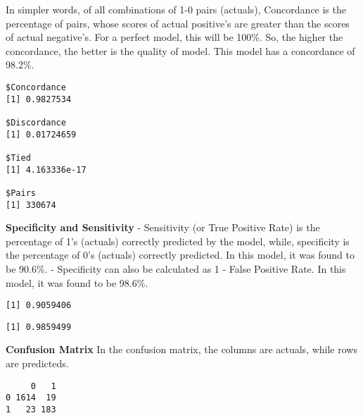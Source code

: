\documentclass[12pt,twoside]{reedthesis}
\newenvironment{Shaded}{\begin{snugshade}}{\end{snugshade}}
\newcommand{\KeywordTok}[1]{\textcolor[rgb]{0.13,0.29,0.53}{\textbf{{#1}}}}
\newcommand{\DataTypeTok}[1]{\textcolor[rgb]{0.13,0.29,0.53}{{#1}}}
\newcommand{\NormalTok}[1]{{#1}}
\theoremstyle{definition}
\theoremstyle{definition}
\theoremstyle{definition}
\theoremstyle{remark}
\begin{document}
In simpler words, of all combinations of 1-0 pairs (actuals),
Concordance is the percentage of pairs, whose scores of actual
positive's are greater than the scores of actual negative's. For a
perfect model, this will be 100\%. So, the higher the concordance, the
better is the quality of model. This model has a concordance of 98.2\%.
\begin{Shaded}
\end{Shaded}
\begin{verbatim}
$Concordance
[1] 0.9827534

$Discordance
[1] 0.01724659

$Tied
[1] 4.163336e-17

$Pairs
[1] 330674
\end{verbatim}
\hfill\break
\textbf{Specificity and Sensitivity} \hfill\break
- Sensitivity (or True Positive Rate) is the percentage of 1's (actuals)
correctly predicted by the model, while, specificity is the percentage
of 0's (actuals) correctly predicted. In this model, it was found to be
90.6\%. \hfill\break
- Specificity can also be calculated as 1 - False Positive Rate. In this
model, it was found to be 98.6\%.
\begin{Shaded}
\end{Shaded}
\begin{verbatim}
[1] 0.9059406
\end{verbatim}
\begin{Shaded}
\end{Shaded}
\begin{verbatim}
[1] 0.9859499
\end{verbatim}
\hfill\break
\textbf{Confusion Matrix} \hfill\break
In the confusion matrix, the columns are actuals, while rows are
predicteds.
\begin{Shaded}
\end{Shaded}
\begin{verbatim}
     0   1
0 1614  19
1   23 183
\end{verbatim}
\end{document}
